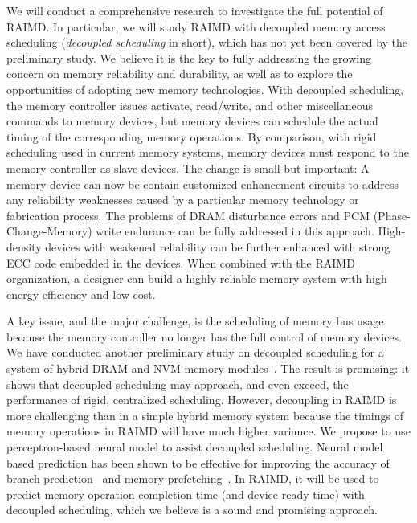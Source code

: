 \documentclass[11pt]{article}
\begin{document}
We will conduct a comprehensive research to investigate the full potential of
RAIMD.  In particular, we will study RAIMD with decoupled memory access
scheduling ({\em decoupled scheduling} in short), which has not yet been covered
by the preliminary study.  We believe it is the key to fully addressing the
growing concern on memory reliability and durability, as well as to explore the
opportunities of adopting new memory technologies.  With decoupled scheduling,
the memory controller issues activate, read/write, and other miscellaneous
commands to memory devices, but memory devices can schedule the actual timing of
the corresponding memory operations.   By comparison, with rigid scheduling used
in current memory systems, memory devices must respond to the memory controller
as slave devices.  The change is small but important: A memory device can now be
contain customized enhancement circuits to address any reliability weaknesses
caused by a particular memory technology or fabrication process.  The problems
of DRAM disturbance errors and PCM (Phase-Change-Memory) write endurance can be
fully addressed in this approach.  High-density devices with weakened
reliability can be further enhanced with strong ECC code embedded in the
devices.  When combined with the RAIMD organization, a designer can build a
highly reliable memory system with high energy efficiency and low cost.

A key issue, and the major challenge, is the scheduling of memory bus usage
because the memory controller no longer has the full control of memory devices.
We have conducted another preliminary study on decoupled scheduling for a system
of hybrid DRAM and NVM memory modules~\cite{Trung:pomi}.  The result is
promising: it shows that decoupled scheduling may approach, and even exceed, the
performance of rigid, centralized scheduling.  However, decoupling in RAIMD is
more challenging than in a simple hybrid memory system because the timings of
memory operations in RAIMD will have much higher variance.  We propose to use
perceptron-based neural model to assist decoupled scheduling.  Neural model
based prediction has been shown to be effective for improving the accuracy of
branch prediction~\cite{Jimenez:hpca01,Bhatia:isca19} and memory
prefetching~\cite{Garza:isca19}.  In RAIMD, it will be used to predict memory
operation completion time (and device ready time) with decoupled scheduling,
which we believe is a sound and promising approach.

\end{document}
